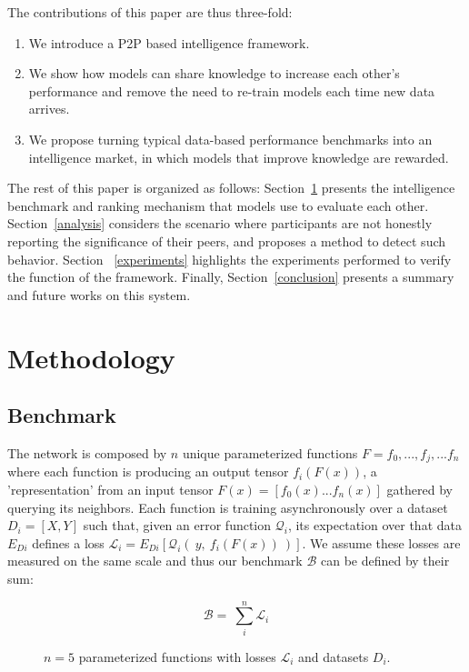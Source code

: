 \documentclass{article}
\begin{document}
The contributions of this paper are thus three-fold:
\begin{enumerate}
	\item We introduce a P2P based intelligence framework.
	\item We show how models can share knowledge to increase each other's performance and remove the need to re-train models each time new data arrives. 
	\item We propose turning typical data-based performance benchmarks into an intelligence market, in which models that improve knowledge are rewarded. 
\end{enumerate}

The rest of this paper is organized as follows: Section~\ref{methodology} presents the intelligence benchmark and ranking mechanism that models use to evaluate each other. Section~\ref{analysis} considers the scenario where participants are not honestly reporting the significance of their peers, and proposes a method to detect such behavior. Section ~\ref{experiments} highlights the experiments performed to verify the function of the framework. Finally, Section~\ref{conclusion} presents a summary and future works on this system.

\section{Methodology}
\label{methodology}

\subsection{Benchmark}

The network is composed by $n$ unique parameterized functions $F = {f_0, ...,  f_j, ...f_n}$ where each function is producing an output tensor $f_i(F(x))$, a 'representation' from an input tensor $F(x) = [f_0{(x)} ... f_n{(x)}]$ gathered by querying its neighbors. Each function is training asynchronously over a dataset $D_i=[X,Y]$ such that, given an error function $\mathcal{Q}_i$, its expectation over that data $E_{Di}$ defines a loss $\mathcal{L}_i = E_{Di}[\mathcal{Q}_i( \ y, \ f_i(F(x)) \ )]$. We assume these losses are measured on the same scale and thus our benchmark $\mathcal{B}$ can be defined by their sum:
\bigskip

\begin{equation}
\mathcal{B} = \ \sum_{i}^{n} \mathcal{L}_i 
\end{equation}

\begin{figure}[H]
	\centering
	\hspace*{-2cm}
	
	\caption{$n=5$ parameterized functions with losses $\mathcal{L}_i$ and datasets $D_i$.}
\end{figure}{}
\end{document}
